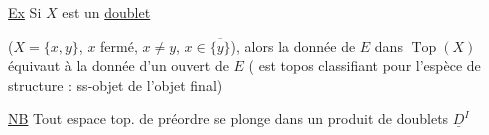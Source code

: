 \uline{Ex} Si $X$ est un \uline{doublet} 


($X=\{x,y\}$,   $x$ fermé, $x\ne y$, $x\in\overline{\{y\}}$), alors la donnée de $E$ dans $\operatorname{Top}(X)$ équivaut à la donnée d'un ouvert de $E$ (  est topos classifiant pour l'espèce de structure : ss-objet de l'objet final)

\uline{NB} Tout espace top. de préordre se plonge dans un produit de doublets $\underline D^{I}$
